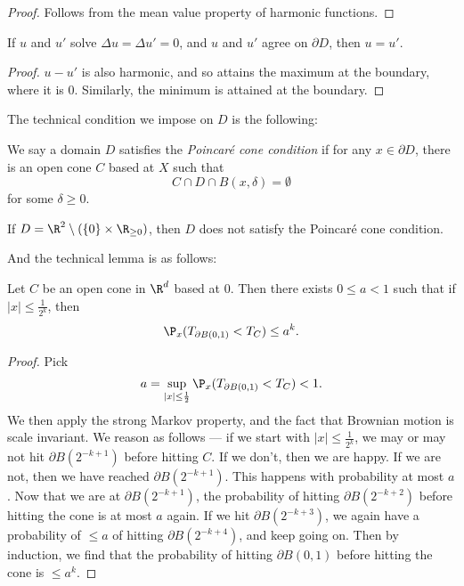 \documentclass[a4paper]{article}
\begin{document}
\begin{proof}
  Follows from the mean value property of harmonic functions.
\end{proof}

\begin{cor}
  If $u$ and $u'$ solve $\Delta u = \Delta u' = 0$, and $u$ and $u'$ agree on $\partial D$, then $u = u'$.
\end{cor}

\begin{proof}
  $u - u'$ is also harmonic, and so attains the maximum at the boundary, where it is $0$. Similarly, the minimum is attained at the boundary.
\end{proof}

The technical condition we impose on $D$ is the following:
\begin{defi}
  We say a domain $D$ satisfies the \emph{Poincar\'e cone condition} if for any $x \in \partial D$, there is an open cone $C$ based at $X$ such that
  \[
    C \cap D \cap B(x, \delta) = \emptyset
  \]
  for some $\delta \geq 0$.
\end{defi}

\begin{eg}
  If $D = \R^2 \setminus (\{0\} \times \R_{\geq 0})$, then $D$ does not satisfy the Poincar\'e cone condition.
\end{eg}
And the technical lemma is as follows:
\begin{lemma}
  Let $C$ be an open cone in $\R^d$ based at $0$. Then there exists $0 \leq a < 1$ such that if $|x| \leq \frac{1}{2^k}$, then
  \[
    \P_x(T_{\partial B(0, 1)} < T_C) \leq a^k.
  \]
\end{lemma}

\begin{proof}
  Pick
  \[
    a = \sup_{|x| \leq \frac{1}{2}} \P_x(T_{\partial B(0, 1)} < T_C) < 1.
  \]
  We then apply the strong Markov property, and the fact that Brownian motion is scale invariant. We reason as follows --- if we start with $|x| \leq \frac{1}{2^k}$, we may or may not hit $\partial B(2^{-k + 1})$ before hitting $C$. If we don't, then we are happy. If we are not, then we have reached $\partial B(2^{-k + 1})$. This happens with probability at most $a$. Now that we are at $\partial B(2^{-k + 1})$, the probability of hitting $\partial B(2^{-k + 2})$ before hitting the cone is at most $a$ again. If we hit $\partial B(2^{-k + 3})$, we again have a probability of $\leq a$ of hitting $\partial B(2^{-k + 4})$, and keep going on. Then by induction, we find that the probability of hitting $\partial B(0, 1)$ before hitting the cone is $\leq a^k$.
\end{proof}
\end{document}
